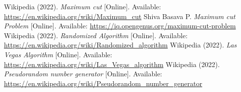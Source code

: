 \documentclass[]{revdetua}
\begin{document}
\begin{thebibliography}{00}

 Wikipedia (2022). \textit{Maximum cut} [Online]. Available: \url{https://en.wikipedia.org/wiki/Maximum_cut}
 Shiva Basava P. \textit{Maximum cut Problem} [Online]. Available: \url{https://iq.opengenus.org/maximum-cut-problem}
 Wikipedia (2022). \textit{Randomized Algorithm} [Online]. Available: \url{https://en.wikipedia.org/wiki/Randomized_algorithm}
 Wikipedia (2022). \textit{Las Vegas Algorithm} [Online]. Available: \url{https://en.wikipedia.org/wiki/Las_Vegas_algorithm}
 Wikipedia (2022). \textit{Pseudorandom number generator} [Online]. Available: \url{https://en.wikipedia.org/wiki/Pseudorandom_number_generator}

\end{thebibliography}
\end{document}
